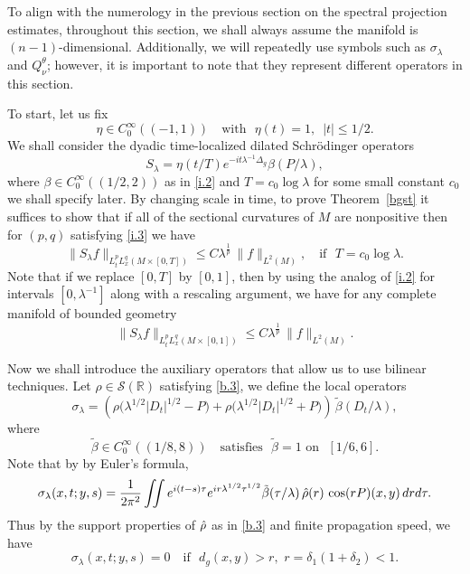 \documentclass[10pt]{amsart}
\newcommand{\la}{\lambda}
\newcommand{\1}{{\bf 1}}
\newcommand{\R}{{\mathbb R}}
\begin{document}
To align with the numerology in the previous section on the spectral projection estimates, throughout this section,
we shall always assume the manifold is $(n-1)$-dimensional. 
Additionally, we will repeatedly use symbols such as $\sigma_\la$ and $Q_\nu^\theta$; however, it is important to note that they represent different operators in this section.


To start, let us fix
\begin{equation}\label{s.1}
\eta\in C^\infty_0((-1,1)) \quad
\text{with } \, \, \eta(t)=1, \, \, \, |t| \le 1/2.
\end{equation}
We shall consider the dyadic time-localized dilated Schr\"odinger operators
\begin{equation}\label{s.2} 
S_\la =\eta(t/T) e^{-it\la^{-1}\Delta_g} \beta(P/\la),
\end{equation}
where $\beta\in C^\infty_0((1/2,2))$ as in \eqref{i.2} and $T=c_0\log\la$ for some small constant $c_0$ we shall specify later. By changing scale in time, to prove Theorem~\ref{bgst}
 it suffices to show that if all of the sectional curvatures of $M$ are nonpositive then for $(p,q)$ satisfying \eqref{i.3} we have
\begin{equation}\label{s.3}
\| S_\la f\|_{L^p_tL^q_x(M\times [0,T])}\le C\la^{\frac1{p}}  \, \|f\|_{L^2(M)}, \quad
\text{if } \, \, T=c_0\log\la.
\end{equation}
Note that if we replace $[0, T]$ by $[0,1]$, then by using the analog of \eqref{i.2} for intervals $[0,\la^{-1}]$ along with a rescaling argument, we have for any complete manifold of bounded geometry
\begin{equation}\label{s.4}
\| S_\la f\|_{L^p_tL^q_x(M\times [0,1])}\le C\la^{\frac1{p}}  \, \|f\|_{L^2(M)}.
\end{equation}




Now we shall introduce the auxiliary operators that allow us to use bilinear
techniques. Let $\rho\in {\mathcal S}(\R)$ satisfying \eqref{b.3}, we define the local operators  
\begin{equation}\label{s.5}
\sigma_\la = \left(\rho\bigl(\la^{1/2}|D_t|^{1/2}-P\bigr)+\rho\bigl(\la^{1/2}|D_t|^{1/2}+P\bigr)\right) \, \tilde \beta(D_t/\la),
\end{equation}
where
\begin{equation}\label{s.6}
\tilde \beta\in C^\infty_0((1/8,8)) \quad \text{satisfies } \, \,
\tilde \beta=1 \, \, 
\text{on } \, \, [1/6,6].
\end{equation}
Note that by  by Euler’s formula,
\begin{equation}\label{s.7}
 \sigma_\la(x,t;y,s)
=\frac{1}{2\pi^2}
\iint e^{i(t-s)\tau}e^{ir\la^{1/2}\tau^{1/2}}
\tilde \beta(\tau/\la) \, \Hat \rho(r)
\, \cos(rP)(x,y) \, dr d\tau.
\end{equation}  
Thus by the support properties of $\Hat \rho$ as in \eqref{b.3} and finite propagation speed, we have 
\begin{equation}\label{s.8}
\sigma_\la(x,t;y,s)=0 \quad \text{if } \, \, d_g(x,y)>r, \, \, 
r= \delta_1(1+\delta_2)<1.
\end{equation}
\end{document}
